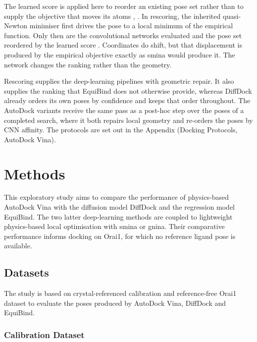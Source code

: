 The learned score is applied here to reorder an existing pose set rather than to supply the objective that moves its atoms \cite{ref056}, \cite{ref058}. In rescoring, the inherited quasi-Newton minimiser first drives the pose to a local minimum of the empirical function. Only then are the convolutional networks evaluated and the pose set reordered by the learned score \cite{ref056}. Coordinates do shift, but that displacement is produced by the empirical objective exactly as smina would produce it. The network changes the ranking rather than the geometry.

Rescoring supplies the deep-learning pipelines with geometric repair. It also supplies the ranking that EquiBind does not otherwise provide, whereas DiffDock already orders its own poses by confidence and keeps that order throughout. The AutoDock variants receive the same pass as a post-hoc step over the poses of a completed search, where it both repairs local geometry and re-orders the poses by CNN affinity. The protocols are set out in the Appendix (Docking Protocols, AutoDock Vina).

\hypertarget{methods}{%
\chapter{\texorpdfstring{Methods }{Methods }}\label{methods}}

This exploratory study aims to compare the performance of physics-based AutoDock Vina with the diffusion model DiffDock and the regression model EquiBind. The two latter deep-learning methods are coupled to lightweight physics-based local optimisation with smina or gnina. Their comparative performance informs docking on Orai1, for which no reference ligand pose is available.

\hypertarget{datasets}{%
\section{Datasets}\label{datasets}}

The study is based on crystal-referenced calibration and reference-free Orai1 dataset to evaluate the poses produced by AutoDock Vina, DiffDock and EquiBind.

\protect\hypertarget{_Toc235735885}{}{}

\hypertarget{calibration-dataset}{%
\subsection{Calibration Dataset}\label{calibration-dataset}}

